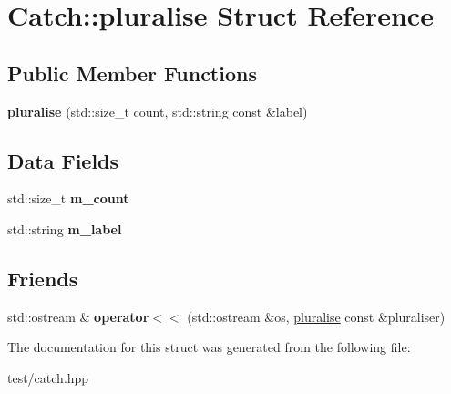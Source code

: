 \hypertarget{structCatch_1_1pluralise}{}\section{Catch\+:\+:pluralise Struct Reference}
\label{structCatch_1_1pluralise}
\subsection*{Public Member Functions}
\begin{DoxyCompactItemize}
\item 
{\bfseries pluralise} (std\+::size\+\_\+t count, std\+::string const \&label)\hypertarget{structCatch_1_1pluralise_a5c55e22de2416cfe416edf715c6b9234}{}\label{structCatch_1_1pluralise_a5c55e22de2416cfe416edf715c6b9234}

\end{DoxyCompactItemize}
\subsection*{Data Fields}
\begin{DoxyCompactItemize}
\item 
std\+::size\+\_\+t {\bfseries m\+\_\+count}\hypertarget{structCatch_1_1pluralise_a4dce2fa13ec6f00fac09b2418265441e}{}\label{structCatch_1_1pluralise_a4dce2fa13ec6f00fac09b2418265441e}

\item 
std\+::string {\bfseries m\+\_\+label}\hypertarget{structCatch_1_1pluralise_a8849cbdd3f11ebe7747597c8644e8793}{}\label{structCatch_1_1pluralise_a8849cbdd3f11ebe7747597c8644e8793}

\end{DoxyCompactItemize}
\subsection*{Friends}
\begin{DoxyCompactItemize}
\item 
std\+::ostream \& {\bfseries operator$<$$<$} (std\+::ostream \&os, \hyperlink{structCatch_1_1pluralise}{pluralise} const \&pluraliser)\hypertarget{structCatch_1_1pluralise_aa7dac6b165514c1f85e0695d678fdef5}{}\label{structCatch_1_1pluralise_aa7dac6b165514c1f85e0695d678fdef5}

\end{DoxyCompactItemize}


The documentation for this struct was generated from the following file\+:\begin{DoxyCompactItemize}
\item 
test/catch.\+hpp\end{DoxyCompactItemize}
